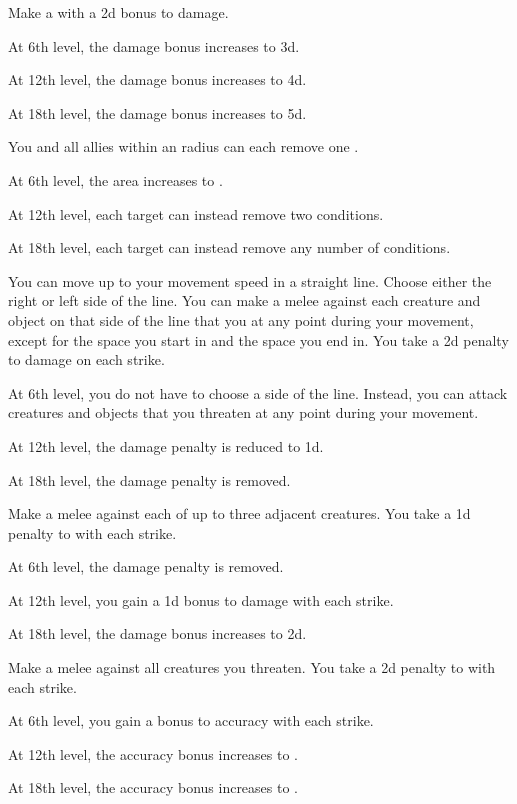 {             Make a  with a \plus2d bonus to damage.
            \par At 6th level, the damage bonus increases to \plus3d.
            \par At 12th level, the damage bonus increases to \plus4d.
            \par At 18th level, the damage bonus increases to \plus5d.

             You and all allies within an \areamed radius can each remove one .
            \par At 6th level, the area increases to \arealarge.
            \par At 12th level, each target can instead remove two conditions.
            \par At 18th level, each target can instead remove any number of conditions.

             You can move up to your movement speed in a straight line.
            Choose either the right or left side of the line.
            You can make a melee  against each creature and object on that side of the line that you  at any point during your movement, except for the space you start in and the space you end in.
            You take a \minus2d penalty to damage on each strike.
            \par At 6th level, you do not have to choose a side of the line.
            Instead, you can attack creatures and objects that you threaten at any point during your movement.
            \par At 12th level, the damage penalty is reduced to \minus1d.
            \par At 18th level, the damage penalty is removed.

             Make a melee  against each of up to three adjacent creatures.
            You take a \minus1d penalty to  with each strike.
            \par At 6th level, the damage penalty is removed.
            \par At 12th level, you gain a \plus1d bonus to damage with each strike.
            \par At 18th level, the damage bonus increases to \plus2d.

             Make a melee  against all creatures you threaten.
            You take a \minus2d penalty to  with each strike.
            \par At 6th level, you gain a  bonus to accuracy with each strike.
            \par At 12th level, the accuracy bonus increases to .
            \par At 18th level, the accuracy bonus increases to .
        }

